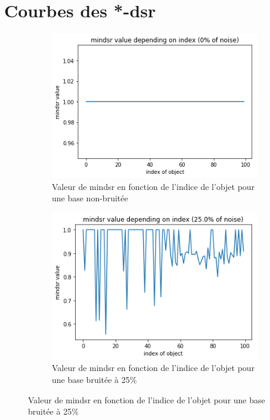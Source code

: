 \documentclass[a4paper]{article}
\begin{document}
\appendix
\newpage

\section{Courbes des *-dsr}
\label{appendix:dsr}

\begin{figure}[H]
	\centering
    \begin{subfigure}[c]{0.46\textwidth}
	    \centering
        \includegraphics[width=\textwidth]{images/mindsr_0.png}
        \caption{Valeur de mindsr en fonction de l'indice de l'objet pour une base
        non-bruitée}
        \label{img:mindsr0}
    \end{subfigure}
    \begin{subfigure}[c]{0.46\textwidth}
	    \centering
	    \includegraphics[width=\textwidth]{images/mindsr_25.png}
        \caption{Valeur de mindsr en fonction de l'indice de l'objet pour une base
        bruitée à 25\%}
        \label{img:mindsr25}
    \end{subfigure}


\end{figure}
\end{document}
